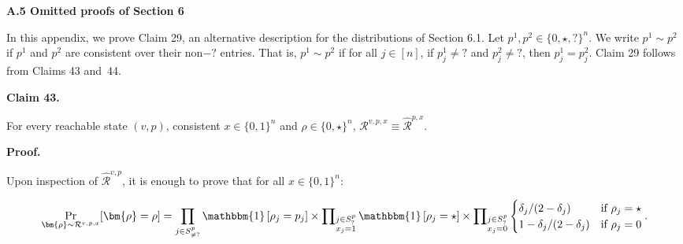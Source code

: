 \par\medskip\noindent\textbf{
A.5 Omitted proofs of Section 6
}\par




In this appendix, we prove Claim 29, an alternative description for the distributions of Section 6.1. Let $p^{1},p^{2}\in\{0,\star,\mathord{?}\}^{n}$. We write $p^{1}\sim p^{2}$ if $p^{1}$ and $p^{2}$ are consistent over their non$-\mathord{?}$ entries. That is, $p^{1}\sim p^{2}$ if for all $j\in[n]$, if $p^{1}_{j}\neq\mathord{?}$ and $p^{2}_{j}\neq\mathord{?}$, then $p^{1}_{j}=p^{2}_{j}$. Claim 29 follows from Claims 43 and 44.\par





\par\medskip\noindent\textbf{
Claim 43. 
}\par



For every reachable state $(v,p)$, consistent $x\in\{0,1\}^{n}$ and $\rho\in\{0,\star\}^{n}$, $\mathcal{R}^{v,p,x}\equiv\widehat{\mathcal{R}}^{p,x}$.\par






\par\medskip\noindent\textbf{
\textbf{Proof}.}\par




Upon inspection of $\widehat{\mathcal{R}}^{v,p}$, it is enough to prove that for all $x\in\{0,1\}^{n}$:\par


\[\begin{gathered}
\Pr_{\bm{\rho}\sim\mathcal{R}^{v,p,x}}[\bm{\rho}=\rho]=\prod_{j\in S^{p}_{\neq\mathord{?}}}\mathbbm{1}\left[\rho_{j}=p_{j}\right]\times\prod\nolimits_{\begin{subarray}{c}j\in S^{p}_{\mathord{?}}\\
x_{j}=1\end{subarray}}\mathbbm{1}\left[\rho_{j}=\star\right]\times\prod\nolimits_{\begin{subarray}{c}j\in S^{p}_{\mathord{?}}\\
x_{j}=0\end{subarray}}\begin{cases}\delta_{j}/(2-\delta_{j})&\textup{if $\rho_{j}=\star$}\\
1-\delta_{j}/(2-\delta_{j})&\textup{if $\rho_{j}=0$}\end{cases}.
\end{gathered}\]


